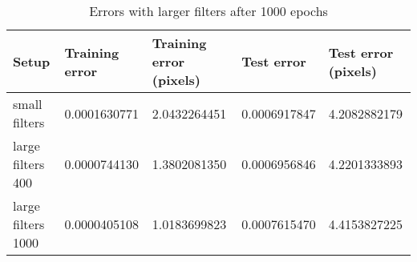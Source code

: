 \begin{table}[h!]
\centering
\footnotesize
\begin{tabular}{|l|l|l|l|l|}
	\hline
		\textbf{Setup} & \textbf{Training error} & \textbf{Training error (pixels)} & \textbf{Test error} & \textbf{Test error (pixels)}\\
	\hline
		small filters		& 0.0001630771%
							& 2.0432264451%
							& 0.0006917847%
							& 4.2082882179%
							\\
	\hline
		large filters 400	& 0.0000744130%
							& 1.3802081350%
							& 0.0006956846%
							& 4.2201333893%
							\\
	\hline
		large filters 1000	& 0.0000405108%
							& 1.0183699823%
							& 0.0007615470%
							& 4.4153827225%
							\\
	\hline
	\end{tabular}
	\normalsize
	\caption{Errors with larger filters after 1000 epochs}
	\label{tab:cnn_errors_largerfilters_1000}
\end{table}
